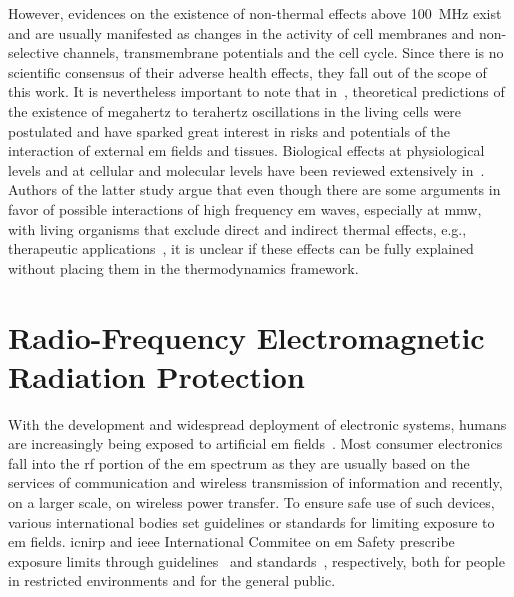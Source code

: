 However, evidences on the existence of non-thermal effects above \SI{100}{\MHz} exist~\cite{Romanenko2017interaction} and are usually manifested as changes in the activity of cell membranes and non-selective channels, transmembrane potentials and the cell cycle.
Since there is no scientific consensus of their adverse health effects, they fall out of the scope of this work.
It is nevertheless important to note that in~\cite{Fröhlich1968Long}, theoretical predictions of the existence of megahertz to terahertz oscillations in the living cells were postulated and have sparked great interest in risks and potentials of the interaction of external \gls{em} fields and tissues.
Biological effects at physiological levels and at cellular and molecular levels have been reviewed extensively in~\cite{Pakhomov1998Current,Zhadobov2011Millimeter}.
Authors of the latter study argue that even though there are some arguments in favor of possible interactions of high frequency \gls{em} waves, especially at \gls{mmw}, with living organisms that exclude direct and indirect thermal effects, e.g., therapeutic applications~\cite{Ziskin2006Physiological}, it is unclear if these effects can be fully explained without placing them in the thermodynamics framework.

\section{Radio-Frequency Electromagnetic Radiation Protection}
With the development and widespread deployment of electronic systems, humans are increasingly being exposed to artificial \gls{em} fields~\cite{Hirata2021Assessment}.
Most consumer electronics fall into the \gls{rf} portion of the \gls{em} spectrum as they are usually based on the services of communication and wireless transmission of information and recently, on a larger scale, on wireless power transfer.
To ensure safe use of such devices, various international bodies set guidelines or standards for limiting exposure to \gls{em} fields.
\Gls{icnirp} and \gls{ieee} International Commitee on \gls{em} Safety prescribe exposure limits through guidelines~\cite{ICNIRP2020Guidelines} and standards~\cite{IEEE2019Standard}, respectively, both for people in restricted environments and for the general public.

